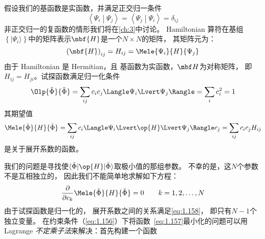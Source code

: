 假设我们的基函数是实函数，并满足正交归一条件
\begin{equation}
 \left\langle\Psi_i\middle\vert\Psi_j\right\rangle = \left\langle\Psi_j\middle\vert\Psi_i\right\rangle = \delta_{ij}
 \label{eq:1.154}
\end{equation}
非正交归一的复函数的情形我们将在\autoref{ch:3}中讨论。
Hamiltonian 算符在基组$\left\{\vert\Psi_i\rangle\right\}$中的矩阵表示$\mbf{H}$是一个$N\times N$的矩阵，
其矩阵元为：
\begin{equation}
 \left(\mbf{H}\right)_{ij} = H_{ij} = \Mele{\Psi_i}{H}{\Psi_j}
 \label{eq:1.155}
\end{equation}
由于 Hamiltonian 是 Hermitian，且
基函数为实函数，$\mbf H$为对称矩阵，
即$H_{ij} = H_{ji}$。试探函数满足归一化条件
\begin{equation}
 \Olp{\tilde\Phi}{\tilde\Phi} = \sum_{ij} c_i c_j \Langle\Psi_i\Lvert\Psi_j\Rangle = \sum_i c_i^2 = 1
 \label{eq:1.156}
\end{equation}
其期望值
\begin{equation}
 \Mele{\tilde\Phi}{H}{\tilde\Phi} = \sum_{ij}c_i\Langle\Psi_i\Lvert\op{H}\Lvert\Psi_j\Rangle c_j = \sum_{ij}c_ic_jH_{ij}
 \label{eq:1.157}
\end{equation}
是关于展开系数的函数。

我们的问题是寻找使$\langle\tilde\Phi\vert\op{H}\vert\tilde\Phi\rangle$取极小值的那组参数。
不幸的是，这$N$个参数不是互相独立的，
因此我们不能简单地求解如下方程：
\begin{equation}
 \frac{\partial}{\partial c_k} \Mele{\tilde\Phi}{H}{\tilde\Phi} = 0 \qquad k = 1, 2, \dots, N
 \label{eq:1.158}
\end{equation}
由于试探函数是归一化的，
展开系数之间的关系满足\autoref{eq:1.158}，
即只有$N-1$个独立变量。
在约束条件（\autoref{eq:1.156}）下将函数~\eqref{eq:1.157}最小化的问题可以用 Lagrange \emph{不定乘子法}来解决：首先构建一个函数

